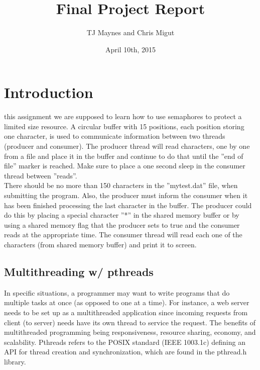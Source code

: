 \documentclass[12pt,journal,compsoc]{IEEEtran}
\begin{document}
\title{Final Project Report}

\author{TJ Maynes and Chris Migut}%
\date{April 10th, 2015}


\maketitle


\IEEEdisplaynontitleabstractindextext
\IEEEpeerreviewmaketitle

\section{Introduction}

 this assignment we are supposed to learn how to use semaphores to protect a limited size resource. A circular buffer with 15 positions, each position storing one character, is used to communicate information between two threads (producer and consumer). The producer thread will read characters, one by one from a file and place it in the buffer and continue to do that until the ”end of file” marker is reached. Make sure to place a one second sleep in the consumer thread between ”reads”. \\

There should be no more than 150 characters in the ”mytest.dat” file, when submitting the program. Also, the producer must inform the consumer when it has been finished processing the last character in the buffer. The producer could do this by placing a special character ”*” in the shared memory buffer or by using a shared memory flag that the producer sets to true and the consumer reads at the appropriate time. The consumer thread will read each one of the characters (from shared memory buffer) and print it to screen.

\subsection{Multithreading w/ pthreads}
In specific situations, a programmer may want to write programs that do multiple tasks at once (as opposed to one at a time). For instance, a web server needs to be set up as a multithreaded application since incoming requests from client (to server) needs have its own thread to service the request. The benefits of multithreaded programming being responsiveness, resource sharing, economy, and scalability. Pthreads refers to the POSIX standard (IEEE 1003.1c) defining an API for thread creation and synchronization, which are found in the pthread.h library.
\end{document}
